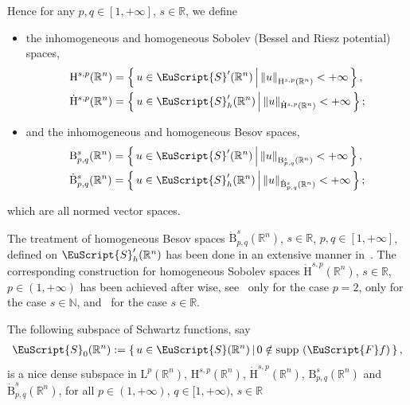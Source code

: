 \documentclass[10pt]{amsart}
\theoremstyle{definition}\newtheorem{defi}[theo]{Definition}\newtheorem{rema}[theo]{Remark}\newtheorem{exam}[theo]{Example}\newtheorem{exem}[theo]{Example}\newtheorem{nota}[theo]{Notation}
\DeclareMathOperator{\supp}{supp\,}
\newcommand{\bbR}{\mathbb{R}}
\newcommand{\bbN}{\mathbb{N}}
\newcommand{\rmH}{\mathrm{H}}%
\newcommand{\rmB}{\mathrm{B}}
\newcommand{\rmL}{\mathrm{L}}
\newcommand{\eus}{\EuScript}
\begin{document}
Hence for any $p,q\in[1,+\infty]$, $s\in\bbR$, we define
\begin{itemize}
\item the inhomogeneous and homogeneous Sobolev (Bessel and Riesz potential) spaces,
\begin{align*}
\rmH^{s,p}(\bbR^n) &=\left\{\, u\in\eus{S}'(\bbR^n) \,\middle|\, \left\| {u} \right\|_{\rmH^{s,p}(\bbR^n)}<+\infty \,\right\},\\
\dot{\rmH}^{s,p}(\bbR^n) &=\left\{\, u\in\eus{S}'_h(\bbR^n) \,\middle|\, \left\| {u} \right\|_{\dot{\rmH}^{s,p}(\bbR^n)}<+\infty \,\right\};
\end{align*}
\item and the inhomogeneous and homogeneous Besov spaces,
\begin{align*}
\rmB^{s}_{p,q}(\bbR^n) &=\left\{\, u\in\eus{S}'(\bbR^n) \,\middle|\, \left\| {u} \right\|_{\rmB^{s}_{p,q}(\bbR^n)}<+\infty \,\right\},\\
\dot{\rmB}^{s}_{p,q}(\bbR^n) &=\left\{\, u\in\eus{S}'_h(\bbR^n) \,\middle|\, \left\| {u} \right\|_{\dot{\rmB}^{s}_{p,q}(\bbR^n)}<+\infty \,\right\}; 
\end{align*}
\end{itemize}
which are all normed vector spaces.

The treatment of homogeneous Besov spaces $\dot{\rmB}^{s}_{p,q}(\bbR^n)$, $s\in\bbR$, $p,q\in[1,+\infty]$, defined on $\eus{S}'_h(\bbR^n)$ has been done in an extensive manner in~\cite[Chapter~2]{bookBahouriCheminDanchin}. The corresponding construction for homogeneous Sobolev spaces $\dot{\rmH}^{s,p}(\bbR^n)$, $s\in\bbR$, $p\in(1,+\infty)$ has been achieved after wise, see~\cite[Chapter~1]{bookBahouriCheminDanchin} only for the case $p=2$, \cite[Chapter~3]{DanchinHieberMuchaTolk2020} only for the case $s\in\bbN $, and~\cite[Section~2]{Gaudin2022} for the case $s\in\bbR$.

The following subspace of Schwartz functions, say
\begin{align*}
\eus{S}_0(\bbR^n):=\left\{\, u\in \eus{S}(\bbR^n)\,\middle|\, 0\notin \supp\left(\eus{F}f\right) \,\right\},
\end{align*}
is a nice dense subspace in $\rmL^p(\bbR^n)$, $\rmH^{s,p}(\bbR^n)$, $\dot{\rmH}^{s,p}(\bbR^n)$, $\rmB^{s}_{p,q}(\bbR^n)$ and $\dot{\rmB}^{s}_{p,q}(\bbR^n)$, for all $p\in(1,+\infty)$, $q\in[1,+\infty)$, $s\in\bbR$
\end{document}
